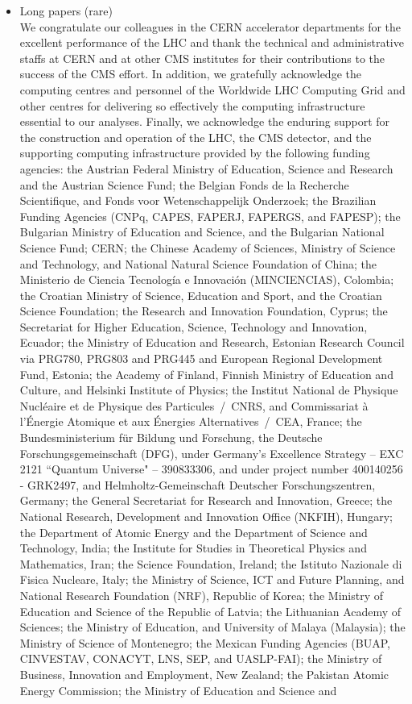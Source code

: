 \documentclass[11pt,twoside,a4paper]{cms-tdr}
\begin{document}
\begin{itemize}
    \item Long papers (rare)\\
  We congratulate our colleagues in the CERN accelerator departments for the excellent performance of the LHC and thank the technical and administrative staffs at CERN and at other CMS institutes for their contributions to the success of the CMS effort. In addition, we gratefully acknowledge the computing centres and personnel of the Worldwide LHC Computing Grid and other centres for delivering so effectively the computing infrastructure essential to our analyses. Finally, we acknowledge the enduring support for the construction and operation of the LHC, the CMS detector, and the supporting computing infrastructure provided by the following funding agencies: the Austrian Federal Ministry of Education, Science and Research and the Austrian Science Fund; the Belgian Fonds de la Recherche Scientifique, and Fonds voor Wetenschappelijk Onderzoek; the Brazilian Funding Agencies (CNPq, CAPES, FAPERJ, FAPERGS, and FAPESP); the Bulgarian Ministry of Education and Science, and the Bulgarian National Science Fund; CERN; the Chinese Academy of Sciences, Ministry of Science and Technology, and National Natural Science Foundation of China; the Ministerio de Ciencia Tecnolog\'ia e Innovaci\'on (MINCIENCIAS), Colombia; the Croatian Ministry of Science, Education and Sport, and the Croatian Science Foundation; the Research and Innovation Foundation, Cyprus; the Secretariat for Higher Education, Science, Technology and Innovation, Ecuador; the Ministry of Education and Research, Estonian Research Council via PRG780, PRG803 and PRG445 and European Regional Development Fund, Estonia; the Academy of Finland, Finnish Ministry of Education and Culture, and Helsinki Institute of Physics; the Institut National de Physique Nucl\'eaire et de Physique des Particules~/~CNRS, and Commissariat \`a l'\'Energie Atomique et aux \'Energies Alternatives~/~CEA, France; the Bundesministerium f\"ur Bildung und Forschung, the Deutsche Forschungsgemeinschaft (DFG), under Germany's Excellence Strategy -- EXC 2121 ``Quantum Universe" -- 390833306, and under project number 400140256 - GRK2497, and Helmholtz-Gemeinschaft Deutscher Forschungszentren, Germany; the General Secretariat for Research and Innovation, Greece; the National Research, Development and Innovation Office (NKFIH), Hungary; the Department of Atomic Energy and the Department of Science and Technology, India; the Institute for Studies in Theoretical Physics and Mathematics, Iran; the Science Foundation, Ireland; the Istituto Nazionale di Fisica Nucleare, Italy; the Ministry of Science, ICT and Future Planning, and National Research Foundation (NRF), Republic of Korea; the Ministry of Education and Science of the Republic of Latvia; the Lithuanian Academy of Sciences; the Ministry of Education, and University of Malaya (Malaysia); the Ministry of Science of Montenegro; the Mexican Funding Agencies (BUAP, CINVESTAV, CONACYT, LNS, SEP, and UASLP-FAI); the Ministry of Business, Innovation and Employment, New Zealand; the Pakistan Atomic Energy Commission; the Ministry of Education and Science and 
\end{itemize}
\end{document}
